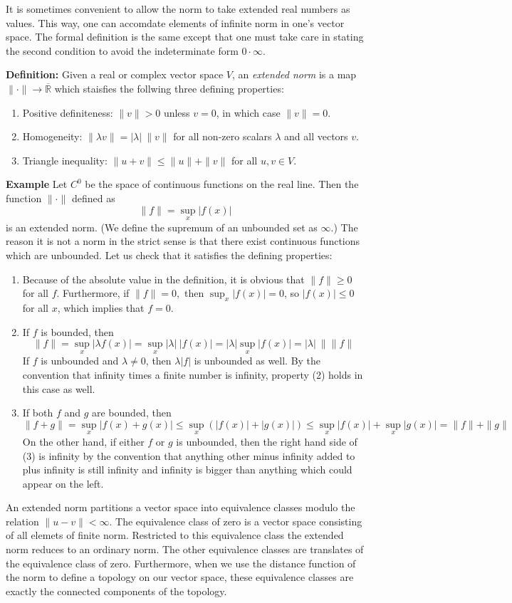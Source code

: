 \documentclass[12pt]{article}
\begin{document}
It is sometimes convenient to allow the norm to take extended real numbers as values.  This way, one can accomdate elements of infinite norm in one's vector space.  The formal definition is the same except that one must take care in stating the second condition to avoid the indeterminate form $0 \cdot \infty$.

{\bf Definition:} Given a real or complex vector space $V$, an \emph{extended norm} is a map $\| \cdot \| \to \overline{\mathbb{R}}$ which staisfies the follwing three defining properties:
\begin{enumerate}
\item  Positive definiteness: $\| v \| > 0$ unless $v = 0$, in which case $\| v \| = 0$.
\item  Homogeneity: $\| \lambda v \| = | \lambda | \> \| v \|$ for all non-zero scalars $\lambda$ and all vectors $v$.
\item  Triangle inequality: $\| u + v \| \le \| u \| + \| v \|$ for all $u, v \in V$.
\end{enumerate}

{\bf Example}  Let $C^0$ be the space of continuous functions on the real line.  Then the function $\| \cdot \|$ defined as
 $$\| f \| = \sup_x |f(x)|$$
is an extended norm.  (We define the supremum of an unbounded set as $\infty$.)  The reason it is not a norm in the strict sense is that there exist continuous functions which are unbounded.  Let us check that it satisfies the defining properties:
\begin{enumerate}
\item  Because of the absolute value in the definition, it is obvious that $\| f \| \ge 0$ for all $f$.  Furthermore, if $\| f \| = 0,$ then $\sup_x |f(x)| = 0$, so $|f(x)| \le 0$ for all $x$, which implies that $f = 0$.
\item  If $f$ is bounded, then 
 $$\| f \| = \sup_x | \lambda f(x) | = \sup_x | \lambda | \> | f(x) | = | \lambda | \sup_x | f(x) | = | \lambda | \> \| \| f \|$$
If $f$ is unbounded and $\lambda \neq 0$, then $\lambda |f|$ is unbounded as well.  By the convention that infinity times a finite number is infinity, property (2) holds in this case as well.
\item  If both $f$ and $g$ are bounded, then
 $$\| f + g \| = \sup_x | f(x) + g(x) | \le \sup_x ( | f(x) | + | g(x) | ) \le \sup_x  | f(x) | + \sup_x | g(x) | = \| f \| + \| g \|$$
On the other hand, if either $f$ or $g$ is unbounded, then the right hand side of (3) is infinity by the convention that anything other minus infinity added to plus infinity is still infinity and infinity is bigger than anything which could appear on the left.
\end{enumerate}

An extended norm partitions a vector space into equivalence classes modulo the relation $\| u - v \| < \infty$.  The equivalence class of zero is a vector space consisting of all elemets of finite norm.  Restricted to this equivalence class the extended norm reduces to an ordinary norm.  The other equivalence classes are translates of the equivalence class of zero.  Furthermore, when we use the distance function of the norm to define a topology on our vector space, these equivalence classes are exactly the connected components of the topology.
\end{document}
